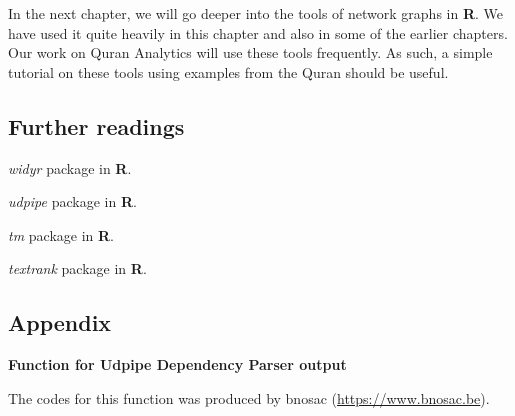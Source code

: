 \documentclass[
]{article}
\begin{document}
In the next chapter, we will go deeper into the tools of network graphs in \textbf{R}. We have used it quite heavily in this chapter and also in some of the earlier chapters. Our work on Quran Analytics will use these tools frequently. As such, a simple tutorial on these tools using examples from the Quran should be useful.

\hypertarget{further-readings-3}{%
\subsection{Further readings}\label{further-readings-3}}

\emph{widyr} package in \textbf{R}. \citep{widyr}

\emph{udpipe} package in \textbf{R}. \citep{udpipe}

\emph{tm} package in \textbf{R}. \citep{tm}

\emph{textrank} package in \textbf{R}. \citep{textrank}

\newpage

\hypertarget{appendix}{%
\subsection*{Appendix}\label{appendix}}

\textbf{Function for Udpipe Dependency Parser output}

The codes for this function was produced by bnosac (\url{https://www.bnosac.be}).

\scriptsize
\end{document}

